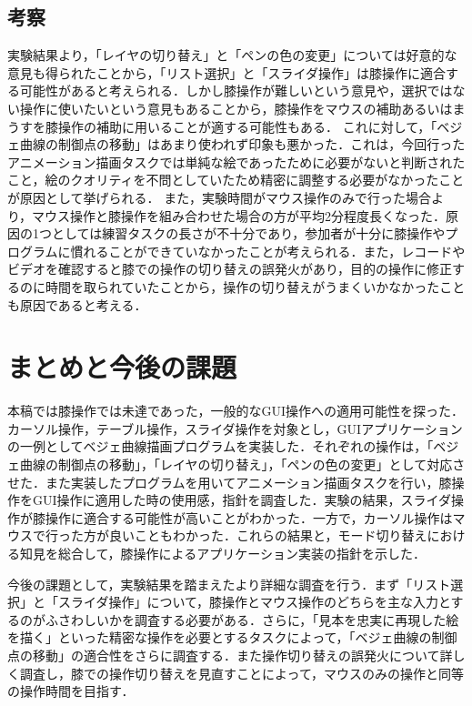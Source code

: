 \documentclass[submit, techrep]{ipsj}
\begin{document}
\subsection{考察}
実験結果より，「レイヤの切り替え」と「ペンの色の変更」については好意的な意見も得られたことから，「リスト選択」と「スライダ操作」は膝操作に適合する可能性があると考えられる．しかし膝操作が難しいという意見や，選択ではない操作に使いたいという意見もあることから，膝操作をマウスの補助あるいはまうすを膝操作の補助に用いることが適する可能性もある．
これに対して，「ベジェ曲線の制御点の移動」はあまり使われず印象も悪かった．これは，今回行ったアニメーション描画タスクでは単純な絵であったために必要がないと判断されたこと，絵のクオリティを不問としていたため精密に調整する必要がなかったことが原因として挙げられる．
また，実験時間がマウス操作のみで行った場合より，マウス操作と膝操作を組み合わせた場合の方が平均2分程度長くなった．原因の1つとしては練習タスクの長さが不十分であり，参加者が十分に膝操作やプログラムに慣れることができていなかったことが考えられる．また，レコードやビデオを確認すると膝での操作の切り替えの誤発火があり，目的の操作に修正するのに時間を取られていたことから，操作の切り替えがうまくいかなかったことも原因であると考える．
\section{まとめと今後の課題}
本稿では膝操作では未達であった，一般的なGUI操作への適用可能性を探った．カーソル操作，テーブル操作，スライダ操作を対象とし，GUIアプリケーションの一例としてベジェ曲線描画プログラムを実装した．それぞれの操作は，「ベジェ曲線の制御点の移動」，「レイヤの切り替え」，「ペンの色の変更」として対応させた．また実装したプログラムを用いてアニメーション描画タスクを行い，膝操作をGUI操作に適用した時の使用感，指針を調査した．実験の結果，スライダ操作が膝操作に適合する可能性が高いことがわかった．一方で，カーソル操作はマウスで行った方が良いこともわかった．これらの結果と，モード切り替えにおける知見を総合して，膝操作によるアプリケーション実装の指針を示した．\par
今後の課題として，実験結果を踏まえたより詳細な調査を行う．まず「リスト選択」と「スライダ操作」について，膝操作とマウス操作のどちらを主な入力とするのがふさわしいかを調査する必要がある．さらに，「見本を忠実に再現した絵を描く」といった精密な操作を必要とするタスクによって，「ベジェ曲線の制御点の移動」の適合性をさらに調査する．また操作切り替えの誤発火について詳しく調査し，膝での操作切り替えを見直すことによって，マウスのみの操作と同等の操作時間を目指す．
\par

%
%
%




\begin{biography}

\end{biography}
\end{document}
